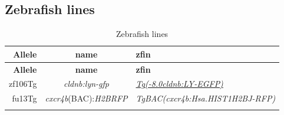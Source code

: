 \documentclass[11pt,singlespacinge,twoside]{reedthesis} %
\theoremstyle{definition}
\theoremstyle{definition}
\theoremstyle{definition}
\theoremstyle{remark}
\begin{document}
\hypertarget{mat-lines}{%
\subsection{Zebrafish lines}\label{mat-lines}}
\begin{longtable}[]{@{}rcl@{}}
\caption{\label{tab:mat-lines} Zebrafish lines}\tabularnewline
\toprule
\begin{minipage}[b]{0.12\columnwidth}\raggedleft
\textbf{Allele}\strut
\end{minipage} & \begin{minipage}[b]{0.29\columnwidth}\centering
\textbf{name}\strut
\end{minipage} & \begin{minipage}[b]{0.50\columnwidth}\raggedright
\textbf{zfin}\strut
\end{minipage}\tabularnewline
\midrule
\endfirsthead
\toprule
\begin{minipage}[b]{0.12\columnwidth}\raggedleft
\textbf{Allele}\strut
\end{minipage} & \begin{minipage}[b]{0.29\columnwidth}\centering
\textbf{name}\strut
\end{minipage} & \begin{minipage}[b]{0.50\columnwidth}\raggedright
\textbf{zfin}\strut
\end{minipage}\tabularnewline
\midrule
\endhead
\begin{minipage}[t]{0.12\columnwidth}\raggedleft
zf106Tg\strut
\end{minipage} & \begin{minipage}[t]{0.29\columnwidth}\centering
\emph{cldnb:lyn-gfp}\strut
\end{minipage} & \begin{minipage}[t]{0.50\columnwidth}\raggedright
\href{//zfin.org/ZDB-ALT-060919-2}{\emph{Tg(-8.0cldnb:LY-EGFP)}}\strut
\end{minipage}\tabularnewline
\begin{minipage}[t]{0.12\columnwidth}\raggedleft
fu13Tg\strut
\end{minipage} & \begin{minipage}[t]{0.29\columnwidth}\centering
\emph{cxcr4b}(BAC):\emph{H2BRFP}\strut
\end{minipage} & \begin{minipage}[t]{0.50\columnwidth}\raggedright
\emph{TgBAC(cxcr4b:Hsa.HIST1H2BJ-RFP)}\strut
\end{minipage}\tabularnewline
\begin{minipage}[t]{0.12\columnwidth}\raggedleft

\end{minipage}
\end{longtable}
\end{document}
